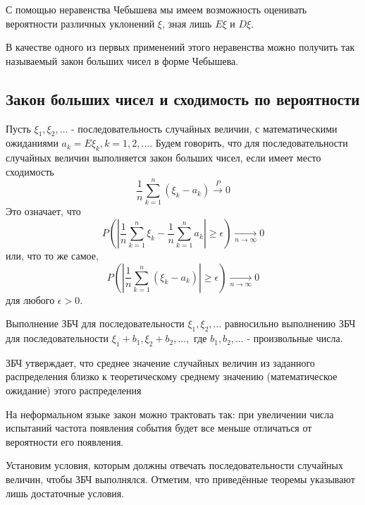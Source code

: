 \begin{remark}
	С помощью неравенства Чебышева мы имеем возможность оценивать вероятности различных уклонений $\xi$, зная лишь $E\xi$ и $D\xi$.
\end{remark}

В качестве одного из первых применений этого неравенства можно получить так называемый закон больших чисел в форме Чебышева.

\subsection{Закон больших чисел и сходимость по вероятности}

\begin{definition}
	Пусть $\xi_1, \xi_2, \dots$ - последовательность случайных величин, с математическими ожиданиями $a_k = E\xi_k, k = 1, 2, \dots$. Будем говорить, что для последовательности случайных величин выполняется закон больших чисел, если имеет место сходимость
	\[ \frac{1}{n} \sum_{k=1}^{n} (\xi_k - a_k) \overset{P}{\to} 0 \]
	Это означает, что
	\[ P \left( \left| \frac{1}{n} \sum_{k=1}^{n} \xi_k - \frac{1}{n} \sum_{k=1}^{n} a_k \right| \ge \epsilon \right) \underset{n \to \infty}{\to} 0 \]
	или, что то же самое,
	\[ P \left( \left| \frac{1}{n} \sum_{k=1}^{n} (\xi_k - a_k) \right| \ge \epsilon \right) \underset{n \to \infty}{\to} 0 \]
	для любого $\epsilon > 0$.
\end{definition}
\begin{remark}
	Выполнение ЗБЧ для последовательности $\xi_1, \xi_2, \dots$ равносильно выполнению ЗБЧ для последовательности $\xi_1 + b_1, \xi_2 + b_2, \dots,$ где $b_1, b_2, \dots$ - произвольные числа.
\end{remark}

ЗБЧ утверждает, что среднее значение случайных величин из заданного распределения близко к теоретическому среднему значению (математическое ожидание) этого распределения

На неформальном языке закон можно трактовать так: при увеличении числа испытаний частота появления события будет все меньше отличаться от вероятности его появления.

Установим условия, которым должны отвечать последовательности случайных величин, чтобы ЗБЧ выполнялся. Отметим, что приведённые теоремы указывают лишь достаточные условия.

